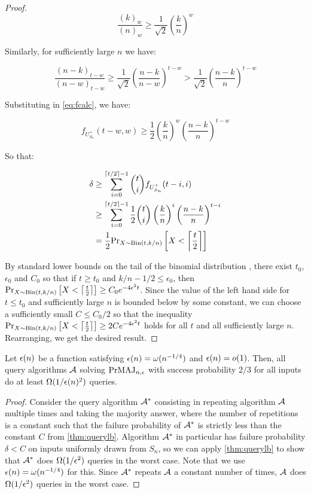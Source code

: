 \begin{proof}
$$
\frac{(k)_w}{(n)_w} \geq \frac{1}{\sqrt{2}}  \left(\frac{k}{n}\right)^w
$$

Similarly, for sufficiently large $n$ we have:

$$
\frac{(n-k)_{t-w}}{(n-w)_{t-w}} \geq \frac{1}{\sqrt{2}} \left(\frac{n-k}{n-w} \right)^{t-w} > \frac{1}{\sqrt{2}} \left(\frac{n-k}{n} \right)^{t-w}
$$

Substituting in \eqref{eq:fcalc}, we have:

$$
f_{U^+_{S_n}}(t-w, w)  \geq \frac{1}{2} \left(\frac{k}{n}\right)^w \left(\frac{n-k}{n} \right)^{t-w}
$$
    
So that:

\begin{align*}
\delta & \geq \sum_{i=0}^{\lceil t/2 \rceil-1} \binom{t}{i} f_{U^+_{S_n}}(t-i, i) \\
       & \geq \sum_{i=0}^{\lceil t/2 \rceil-1} \frac{1}{2} \binom{t}{i} \left(\frac{k}{n}\right)^i \left(\frac{n-k}{n} \right)^{t-i} \\
       & = \frac{1}{2} \text{Pr}_{X \sim \text{Bin}(t, k/n)}\left[X < \left\lceil \frac{t}{2} \right\rceil\right]
\end{align*}

By standard lower bounds on the tail of the binomial distribution \cite{Feller43}, there exist $t_0$, $\epsilon_0$ and $C_0$
so that if $t \geq t_0$ and $k/n - 1/2 \leq \epsilon_0$, then 
$\text{Pr}_{X \sim \text{Bin}(t, k/n)}\left[X < \left\lceil \frac{t}{2} \right\rceil\right] \geq C_0 e^{-4\epsilon^2t}$.
Since the value of the left hand side for $t \leq t_0$ and sufficiently large $n$ is bounded below by some constant, we can choose a sufficiently small $C \leq C_0/2$ so that the inequality 
$\text{Pr}_{X \sim \text{Bin}(t, k/n)}\left[X < \left\lceil \frac{t}{2} \right\rceil\right] \geq 2C e^{-4\epsilon^2t}$ 
holds for all $t$ and all sufficiently large $n$. Rearranging, we get the desired result. 

\end{proof}

\begin{corollary}
    \label{cor:querylbgen}
Let $\epsilon(n)$ be a function satisfying $\epsilon(n) = \omega(n^{-1/4})$ and $\epsilon(n) = o(1)$. Then, all query
algorithms $\mathcal{A}$ solving $\mathrm{PrMAJ}_{n,\epsilon}$ with success probability $2/3$ for all inputs do at least $\Omega(1/\epsilon(n)^2)$
queries. 
\end{corollary}
\begin{proof}
Consider the query algorithm $\mathcal{A}^*$ consisting in repeating algorithm $\mathcal{A}$  multiple times and 
taking the majority answer, where the number of repetitions is a constant such
that the failure probability of $\mathcal{A}^*$ is strictly less than 
the constant $C$ from \cref{thm:querylb}. 
Algorithm $\mathcal{A}^*$ in particular has failure probability $\delta < C$ on inputs 
uniformly drawn from $S_n$, so we can apply \cref{thm:querylb} to show that
$\mathcal{A}^*$ does $\Omega(1/\epsilon^2)$ queries in the worst case. Note that we use $\epsilon(n) = \omega(n^{-1/4})$
for this.
Since $\mathcal{A}^*$ repeats $\mathcal{A}$ a constant number of times, $\mathcal{A}$ does $\Omega(1/\epsilon^2)$ queries in the worst case. 
\end{proof}

